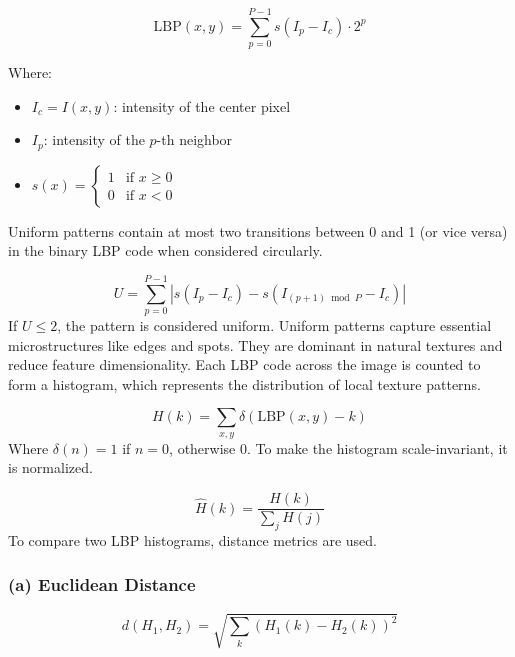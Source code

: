 \documentclass{ijclclp}
\begin{document}
\begin{equation}
\text{LBP}(x, y) = \sum_{p=0}^{P-1} s(I_p - I_c) \cdot 2^p
\label{eq:lbp}
\end{equation}

Where:
\begin{itemize}
  \item \( I_c = I(x, y) \): intensity of the center pixel
  \item \( I_p \): intensity of the \(p\)-th neighbor
  \item \( s(x) = 
    \begin{cases}
    1 & \text{if } x \geq 0 \\
    0 & \text{if } x < 0
    \end{cases}
  \)
\end{itemize}
Uniform patterns contain at most two transitions between 0 and 1 (or vice versa) in the binary LBP code when considered circularly.

\textbf{}
\begin{equation}
U = \sum_{p=0}^{P-1} \left| s(I_p - I_c) - s(I_{(p+1) \bmod P} - I_c) \right|
\label{eq:uniform_lbp}
\end{equation}
\newline
If \( U \leq 2 \), the pattern is considered uniform.
Uniform patterns capture essential microstructures like edges and spots. They are dominant in natural textures and reduce feature dimensionality.
\newline
Each LBP code across the image is counted to form a histogram, which represents the distribution of local texture patterns.

\textbf{}
\begin{equation}
H(k) = \sum_{x, y} \delta(\text{LBP}(x, y) - k)
\label{eq:histogram}
\end{equation}
Where \( \delta(n) = 1 \) if \( n = 0 \), otherwise \( 0 \).
To make the histogram scale-invariant, it is normalized.

\textbf{}
\begin{equation}
\hat{H}(k) = \frac{H(k)}{\sum_{j} H(j)}
\label{eq:normalized_histogram}
\end{equation}
To compare two LBP histograms, distance metrics are used.

\subsubsection*{(a) Euclidean Distance}
\begin{equation}
d(H_1, H_2) = \sqrt{ \sum_{k} \left( H_1(k) - H_2(k) \right)^2 }
\label{eq:euclidean}
\end{equation}
\end{document}

